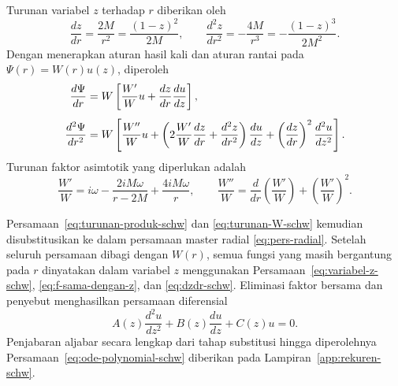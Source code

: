 Turunan variabel $z$ terhadap $r$ diberikan oleh
\begin{equation}
    \frac{dz}{dr}=\frac{2M}{r^2}=\frac{(1-z)^2}{2M}, \qquad \frac{d^2z}{dr^2}=-\frac{4M}{r^3}=-\frac{(1-z)^3}{2M^2}.
    \label{eq:dzdr-schw}
\end{equation}
Dengan menerapkan aturan hasil kali dan aturan rantai pada $\Psi(r)=W(r)u(z)$, diperoleh
\begin{align}
    \frac{d\Psi}{dr} &= W\left[\frac{W'}{W}u+\frac{dz}{dr}\frac{du}{dz}\right], \notag\\[4pt]
    \frac{d^2\Psi}{dr^2} &= W\left[\frac{W''}{W}u+\left(2\frac{W'}{W}\frac{dz}{dr}+\frac{d^2z}{dr^2}\right)\frac{du}{dz}+\left(\frac{dz}{dr}\right)^2\frac{d^2u}{dz^2}\right].
    \label{eq:turunan-produk-schw}
\end{align}
Turunan faktor asimtotik yang diperlukan adalah
\begin{equation}
    \frac{W'}{W}=i\omega-\frac{2iM\omega}{r-2M}+\frac{4iM\omega}{r}, \qquad \frac{W''}{W}=\frac{d}{dr}\left(\frac{W'}{W}\right)+\left(\frac{W'}{W}\right)^2.
    \label{eq:turunan-W-schw}
\end{equation}

Persamaan~\eqref{eq:turunan-produk-schw} dan \eqref{eq:turunan-W-schw} kemudian disubstitusikan ke dalam persamaan master radial \eqref{eq:pers-radial}. Setelah seluruh persamaan dibagi dengan $W(r)$, semua fungsi yang masih bergantung pada $r$ dinyatakan dalam variabel $z$ menggunakan Persamaan~\eqref{eq:variabel-z-schw}, \eqref{eq:f-sama-dengan-z}, dan \eqref{eq:dzdr-schw}. Eliminasi faktor bersama dan penyebut menghasilkan persamaan diferensial
\begin{equation}
    A(z)\frac{d^2u}{dz^2}+B(z)\frac{du}{dz}+C(z)u=0.
    \label{eq:ode-polynomial-schw}
\end{equation}
Penjabaran aljabar secara lengkap dari tahap substitusi hingga diperolehnya Persamaan~\eqref{eq:ode-polynomial-schw} diberikan pada Lampiran~\ref{app:rekuren-schw}.

